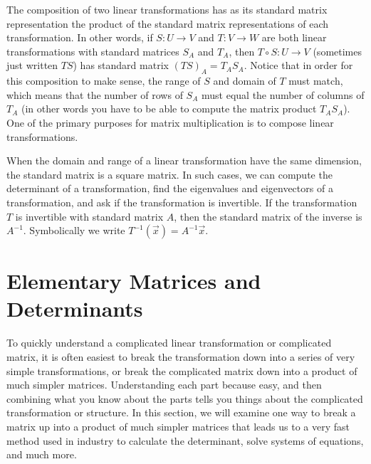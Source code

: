 The composition of two linear transformations has as its standard matrix representation the product of the standard matrix representations of each transformation. 
In other words, if $S\colon  U\to V$ and $T\colon V\to W$ are both linear transformations with standard matrices $S_A$ and $T_A$, then $T\circ S\colon U \to V$ (sometimes just written $TS$) has standard matrix $(TS)_A=T_AS_A$. 
Notice that in order for this composition to make sense, the range of $S$ and domain of $T$ must match, which means that the number of rows of $S_A$ must equal the number of columns of $T_A$ (in other words you have to be able to compute the matrix product $T_AS_A$). 
One of the primary purposes for matrix multiplication is to compose linear transformations. 

When the domain and range of a linear transformation have the same dimension, the standard matrix is a square matrix.  
In such cases, we can compute the determinant of a transformation, find the eigenvalues and eigenvectors of a transformation, and ask if the transformation is invertible. 
If the transformation $T$ is invertible with standard matrix $A$, then the standard matrix of the inverse is $A^{-1}$. Symbolically we write $T^{-1}(\vec x) = A^{-1}\vec x$. 


\section{Elementary Matrices and Determinants}


To quickly understand a complicated linear transformation or complicated matrix, it is often easiest to break the transformation down into a series of very simple transformations, or break the complicated matrix down into a product of much simpler matrices.  Understanding each part because easy, and then combining what you know about the parts tells you things about the complicated transformation or structure.  In this section, we will examine one way to break a matrix up into a product of much simpler matrices that leads us to a very fast method used in industry to calculate the determinant, solve systems of equations, and much more.

